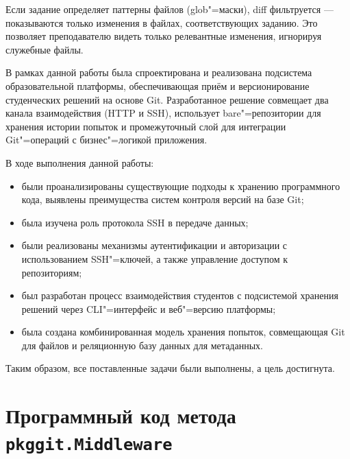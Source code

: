 \documentclass[coursework]{SCWorks}
\begin{document}
Если задание определяет паттерны файлов (glob"=маски), diff фильтруется --- показываются только изменения в файлах, соответствующих заданию. Это позволяет преподавателю видеть только релевантные изменения, игнорируя служебные файлы.

\conclusion

В рамках данной работы была спроектирована и реализована подсистема образовательной платформы, обеспечивающая приём и версионирование студенческих решений на основе Git. Разработанное решение совмещает два канала взаимодействия (HTTP и SSH), использует bare"=репозитории для хранения истории попыток и промежуточный слой для интеграции Git"=операций с бизнес"=логикой приложения.

В ходе выполнения данной работы:
\begin{itemize}
	\item были проанализированы существующие подходы к хранению программного кода, выявлены преимущества систем контроля версий на базе Git;
	\item была изучена роль протокола SSH в передаче данных;
	\item были реализованы механизмы аутентификации и авторизации с использованием SSH"=ключей, а также управление доступом к репозиториям;
	\item был разработан процесс взаимодействия студентов с подсистемой хранения решений через CLI"=интерфейс и веб"=версию платформы;
	\item была создана комбинированная модель хранения попыток, совмещающая Git для файлов и реляционную базу данных для метаданных.
\end{itemize}

Таким образом, все поставленные задачи были выполнены, а цель достигнута.




\appendix

\section{Программный код метода \texttt{pkggit.Middleware}}
\label{sec:Middleware}
\end{document}
